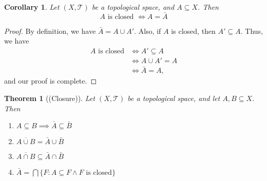 \documentclass[12pt,a4paper]{article}
\author{Jeremiah Givens}
\theoremstyle{theorem}
\newtheorem{theorem}{Theorem}
\newtheorem{corollary}{Corollary}
\theoremstyle{definition}
\newcommand{\Tau}{\mathcal{T}}
\begin{document}
\begin{corollary}
Let $(X, \Tau)$ be a topological space, and $A \subseteq X$. Then 
\begin{equation*}
A \text{ is closed } \iff A = \bar{A}
\end{equation*}
\end{corollary}

\begin{proof}
By definition, we have $\bar{A} = A \cup A'$.  Also, if $A$ is closed, then $A' \subseteq A$. Thus,  we have
\begin{align*}
A \text{ is closed} &\iff A' \subseteq A\\
&\iff A \cup A' = A\\
&\iff \bar{A} = A\text{,}
\end{align*}
and our proof is complete.
\end{proof}

\begin{theorem}[(Closure)] Let $(X, \Tau)$ be a topological space, and let $A,B \subseteq X$. Then 
\begin{enumerate}
\item $A \subseteq B \implies \bar{A} \subseteq \bar{B}$
\item $\overline{A \cup B} = \bar{A} \cup \bar{B}$
\item $\overline{A \cap B} \subseteq \bar{A} \cap \bar{B}$
\item $\bar{A} = \bigcap \{F : A \subseteq F \land F \text{ is closed} \}$
\end{enumerate}
\end{theorem}
\end{document}
